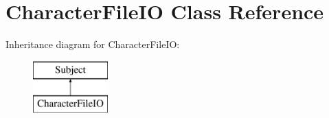 \hypertarget{class_character_file_i_o}{}\section{Character\+File\+IO Class Reference}
\label{class_character_file_i_o}
Inheritance diagram for Character\+File\+IO\+:\begin{figure}[H]
\begin{center}
\leavevmode
\includegraphics[height=2.000000cm]{class_character_file_i_o}
\end{center}
\end{figure}
